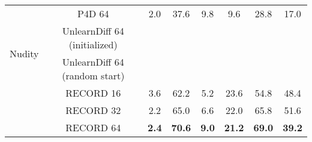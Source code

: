 \begin{tabular}{c|c|c|c|c|c|c|c}
        \midrule
        \multirow{4}{*}{Nudity} 
        & P4D 64  & 2.0  & 37.6 & 9.8 & 9.6 & 28.8 & 17.0 \\
        & UnlearnDiff 64 (initialized) &  &  &  &  &  &  \\
        & UnlearnDiff 64 (random start) &  &  &  &  &  &  \\
        & RECORD 16 & 3.6  & 62.2 & 5.2 & 23.6 & 54.8 & 48.4 \\
        & RECORD 32 & 2.2 & 65.0 & 6.6 & 22.0 & 65.8 & 51.6 \\
        & RECORD 64 & \textbf{2.4} & \textbf{70.6} & \textbf{9.0} & \textbf{21.2} & \textbf{69.0} & \textbf{39.2} \\
    \bottomrule
    \end{tabular}